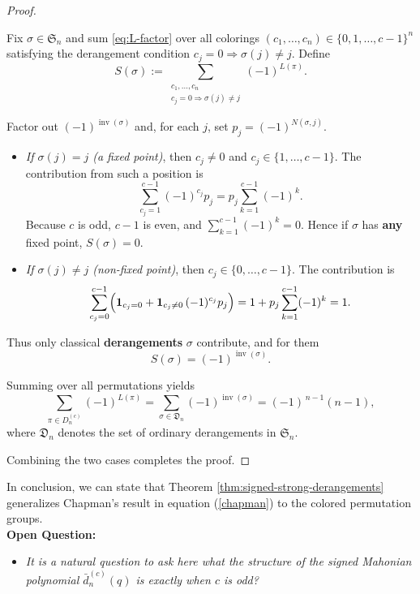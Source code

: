 \documentclass[a4paper,12pt]{article}
\begin{document}
\begin{proof}
\begin{enumerate}
Fix $\sigma\in \mathfrak{S}_n$ and sum \eqref{eq:L-factor} over all colorings
$(c_1,\dots,c_n)\in\{0,1,\dots,c-1\}^n$ satisfying the derangement condition
$c_j=0\Rightarrow\sigma(j)\neq j$.  
Define
\[
S(\sigma):=\sum_{\substack{c_1,\dots,c_n\\ c_j=0\Rightarrow\sigma(j)\neq j}}
(-1)^{L(\pi)}.
\]

Factor out $(-1)^{\operatorname{inv}(\sigma)}$ and, for each $j$, set $p_j=(-1)^{N(\sigma,j)}$.

\begin{itemize}
\item \textit{If $\sigma(j)=j$ (a fixed point)}, then $c_j\neq0$ and $c_j\in\{1,\dots,c-1\}$.  
The contribution from such a position is
\[
\sum_{c_j=1}^{c-1}(-1)^{c_j} p_j
=p_j\sum_{k=1}^{c-1}(-1)^{k}.
\]
Because $c$ is odd, $c-1$ is even, and $\sum_{k=1}^{c-1}(-1)^k=0$.  
Hence if $\sigma$ has \textbf{any} fixed point, $S(\sigma)=0$.

\item \textit{If $\sigma(j)\neq j$ (non-fixed point)}, then $c_j\in\{0,\dots,c-1\}$.  
The contribution is
\[
\sum_{c_j=0}^{c-1}
\Bigl(\mathbf{1}_{c_j=0}
+\mathbf{1}_{c_j\neq0}\,(-1)^{c_j}p_j\Bigr)
=1+p_j\sum_{k=1}^{c-1}(-1)^k=1.
\]
\end{itemize}

Thus only classical \textbf{derangements} $\sigma$ contribute, and for them
\[
S(\sigma)=(-1)^{\operatorname{inv}(\sigma)}.
\]

\medskip

Summing over all permutations yields
\[
\sum_{\pi\in D_n^{(c)}}(-1)^{L(\pi)}
=\sum_{\sigma\in\mathfrak{D}_n}(-1)^{\operatorname{inv}(\sigma)}=(-1)^{\,n-1}(n-1),
\]
where $\mathfrak{D}_n$ denotes the set of ordinary derangements in $\mathfrak{S}_n$.
\end{enumerate}

Combining the two cases completes the proof.
\end{proof}

In conclusion, we can state that Theorem \ref{thm:signed-strong-derangements} generalizes Chapman's result in equation (\ref{chapman}) to the colored permutation groups.\\


\textbf{Open Question:} 
\begin{itemize}
    \item [$\bullet$] \textit{It is a natural question to ask here what the structure of the signed Mahonian polynomial $\bar{d}_{n}^{(c)}(q)$ is exactly when $c$ is odd?}
\end{itemize}
\end{document}
